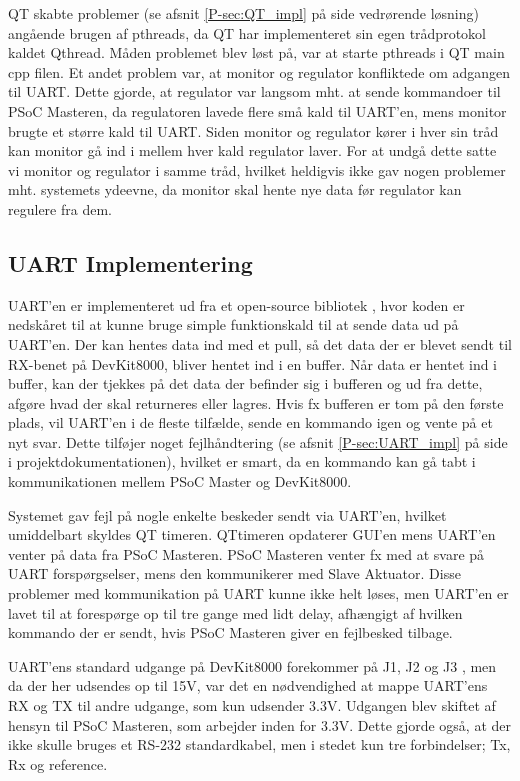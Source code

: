 QT skabte problemer (se afsnit \ref{P-sec:QT_impl}  på side \pageref{P-sec:QT_impl} vedrørende løsning) angående brugen af pthreads, da QT har implementeret sin egen trådprotokol kaldet Qthread. Måden problemet blev løst på, var at starte pthreads i QT main cpp filen. 
Et andet problem var, at monitor og regulator konfliktede om adgangen til UART. 
Dette gjorde, at regulator var langsom mht. at sende kommandoer til PSoC Masteren, da regulatoren lavede flere små kald til UART'en, mens monitor brugte et større kald til UART. Siden monitor og regulator kører i hver sin tråd kan monitor gå ind i mellem hver kald regulator laver. For at undgå dette satte vi monitor og regulator i samme tråd, hvilket heldigvis ikke gav nogen problemer mht. systemets ydeevne, da monitor skal hente nye data før regulator kan regulere fra dem.

\subsection{UART Implementering}

UART'en er implementeret ud fra et open-source bibliotek \cite{lib:UART_opensource}, hvor koden er nedskåret til at kunne bruge simple funktionskald til at sende data ud på UART'en. Der kan hentes data ind med et pull, så det data der er blevet sendt til RX-benet på DevKit8000, bliver hentet ind i en buffer. Når data er hentet ind i buffer, kan der tjekkes på det data der befinder sig i bufferen og ud fra dette, afgøre hvad der skal returneres eller lagres. Hvis fx bufferen er tom på den første plads, vil UART'en i de fleste tilfælde, sende en kommando igen og vente på et nyt svar. Dette tilføjer noget fejlhåndtering (se afsnit \ref{P-sec:UART_impl}  på side \pageref{P-sec:UART_impl} i projektdokumentationen), hvilket er smart, da en kommando kan gå tabt i kommunikationen mellem PSoC Master og DevKit8000.

Systemet gav fejl på nogle enkelte beskeder sendt via UART'en, hvilket umiddelbart skyldes QT timeren. 
QTtimeren opdaterer GUI'en mens UART'en venter på data fra PSoC Masteren. 
PSoC Masteren venter fx med at svare på UART forspørgselser, mens den kommunikerer med Slave Aktuator. 
Disse problemer med kommunikation på UART kunne ikke helt løses, men UART'en er lavet til at forespørge op til tre gange med lidt delay, afhængigt af hvilken kommando der er sendt, hvis PSoC Masteren giver en fejlbesked tilbage.

UART'ens standard udgange på DevKit8000 forekommer på J1, J2 og J3 \cite{lib:DevKit8000_Addon}, men da der her udsendes op til 15V, var det en nødvendighed at mappe UART'ens RX og TX til andre udgange, som kun udsender 3.3V. Udgangen blev skiftet af hensyn til PSoC Masteren, som arbejder inden for 3.3V. Dette gjorde også, at der ikke skulle bruges et RS-232 standardkabel, men i stedet kun tre forbindelser; Tx, Rx og reference.

